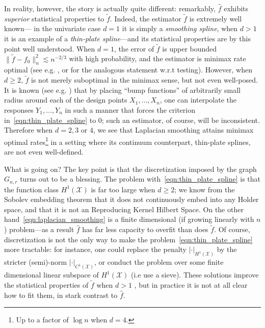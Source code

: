 \documentclass[twoside]{article}
\newcommand{\1}{\mathbf{1}}
\newcommand{\Xset}{\mathcal{X}}
\newcommand{\wt}[1]{\widetilde{#1}}
\newcommand{\wh}[1]{\widehat{#1}}
\theoremstyle{definition}
\theoremstyle{remark}
\begin{document}
In reality, however, the story is actually quite different: remarkably, $\wh{f}$ exhibits \emph{superior} statistical properties to $\wt{f}$. Indeed, the estimator $\wt{f}$ is extremely well known--- in the univariate case $d = 1$ it is simply a \emph{smoothing spline}, when $d > 1$ it is an example of a \emph{thin-plate spline}---and its statistical properties are by this point well understood. When $d = 1$, the error of $\wt{f}$ is upper bounded $\|\wt{f} - f_0\|_n^2 \lesssim n^{-2/3}$ with high probability, and the estimator is minimax rate optimal (see e.g. \cite{vandergeer2000}, or \cite{liu2019} for the analogous statement w.r.t testing). However, when $d \geq 2$, $\wt{f}$ is not merely suboptimal in the minimax sense, but not even well-posed. It is known (see e.g. \cite{green93}) that by placing ``bump functions'' of arbitrarily small radius around each of the design points $X_1,\ldots,X_n$, one can interpolate the responses $Y_1,\ldots,Y_n$ in such a manner that forces the criterion in~\eqref{eqn:thin_plate_spline} to 0; such an estimator, of course, will be inconsistent. Therefore when $d = 2,3$ or $4$, we see that Laplacian smoothing attains minimax optimal rates\footnote{Up to a factor of $\log n$ when $d = 4$.} in a setting where its continuum counterpart, thin-plate splines, are not even well-defined.

What is going on? The key point is that the discretization imposed by the graph $G_{n,r}$ turns out to be a blessing. The problem with~\ref{eqn:thin_plate_spline} is that the function class $H^1(\Xset)$ is far too large when $d \geq 2$; we know from the Sobolev embedding theorem \cite{evans10} that it does not continuously embed into any Holder space, and that it is not an Reproducing Kernel Hilbert Space. On the other hand~\eqref{eqn:laplacian_smoothing} is a finite dimensional (if growing linearly with $n$) problem---as a result $\wh{f}$ has far less capacity to overfit than does $\wt{f}$. Of course, discretization is not the only way to make the problem~\eqref{eqn:thin_plate_spline} more tractable: for instance, one could replace the penalty $|\cdot|_{H^1(\Xset)}$ by the stricter (semi)-norm $|\cdot|_{C^1(\Xset)}$, or conduct the problem over some finite dimensional linear subspace of $H^1(\Xset)$ (i.e use a sieve). These solutions improve the statistical properties of $\wt{f}$ when $d > 1$ \citep{birge1993,birge1998,vandergeer2000}, but in practice it is not at all clear how to fit them, in stark contrast to $\wh{f}$.
\end{document}
